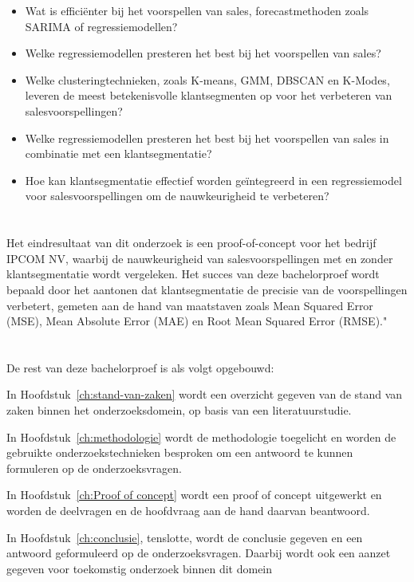 \begin{itemize}
    \item Wat is efficiënter bij het voorspellen van sales, forecastmethoden zoals SARIMA of regressiemodellen?
    \item Welke regressiemodellen presteren het best bij het voorspellen van sales?
     \item Welke clusteringtechnieken, zoals K-means, GMM, DBSCAN en K-Modes, leveren de meest betekenisvolle klantsegmenten op voor het verbeteren van salesvoorspellingen?
    \item Welke regressiemodellen presteren het best bij het voorspellen van sales in combinatie met een klantsegmentatie?
    \item Hoe kan klantsegmentatie effectief worden geïntegreerd in een regressiemodel voor salesvoorspellingen om de nauwkeurigheid te verbeteren?
\end{itemize}



\section{}%
\label{sec:onderzoeksdoelstelling}

Het eindresultaat van dit onderzoek is een proof-of-concept voor het bedrijf IPCOM NV, waarbij de nauwkeurigheid van salesvoorspellingen met en zonder klantsegmentatie wordt vergeleken. Het succes van deze bachelorproef wordt bepaald door het aantonen dat klantsegmentatie de precisie van de voorspellingen verbetert, gemeten aan de hand van maatstaven zoals Mean Squared Error (MSE), Mean Absolute Error (MAE) en Root Mean Squared Error (RMSE)."

\section{}%
\label{sec:opzet-bachelorproef}

De rest van deze bachelorproef is als volgt opgebouwd:

In Hoofdstuk~\ref{ch:stand-van-zaken} wordt een overzicht gegeven van de stand van zaken binnen het onderzoeksdomein, op basis van een literatuurstudie.

In Hoofdstuk~\ref{ch:methodologie} wordt de methodologie toegelicht en worden de gebruikte onderzoekstechnieken besproken om een antwoord te kunnen formuleren op de onderzoeksvragen.

In Hoofdstuk~\ref{ch:Proof of concept} wordt een proof of concept uitgewerkt en worden de deelvragen en de hoofdvraag aan de hand daarvan beantwoord.

In Hoofdstuk~\ref{ch:conclusie}, tenslotte, wordt de conclusie gegeven en een antwoord geformuleerd op de onderzoeksvragen. Daarbij wordt ook een aanzet gegeven voor toekomstig onderzoek binnen dit domein